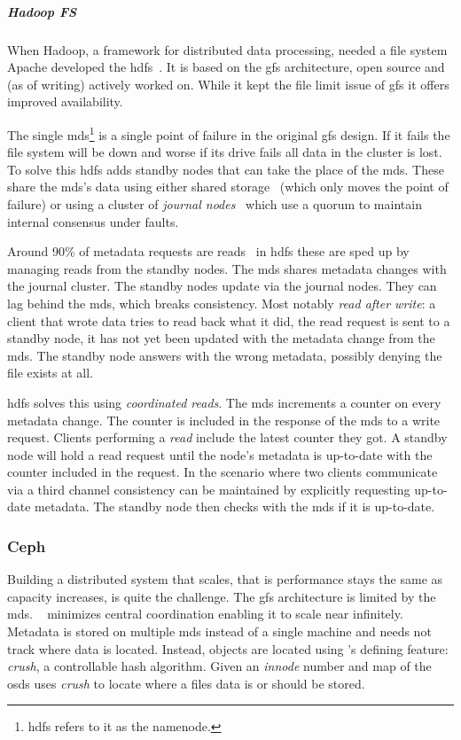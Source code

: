 \subparagraph*{Hadoop FS} \label{sec:hdfs}
When Hadoop, a framework for distributed data processing, needed a file system Apache developed the \ac{hdfs}~\cite{hdfs}. It is based on the \ac{gfs} architecture, open source and (as of writing) actively worked on. While it kept the file limit issue of \ac{gfs} it offers improved availability.

The single \ac{mds}\footnote{\ac{hdfs} refers to it as the namenode.} is a single point of failure in the original \ac{gfs} design. If it fails the file system will be down and worse if its drive fails all data in the cluster is lost. To solve this \ac{hdfs} adds standby nodes that can take the place of the \ac{mds}. These share the \ac{mds}'s data using either shared storage~\cite{hdfs_ha_nfs} (which only moves the point of failure) or using a cluster of \textit{journal nodes}~\cite{hdfs_ha_q} which use a quorum to maintain internal consensus under faults. 

Around 90\% of metadata requests are reads~\cite{hdfs_ha_reads} in \ac{hdfs} these are sped up by managing reads from the standby nodes. The \ac{mds} shares metadata changes with the journal cluster. The standby nodes update via the journal nodes. They can lag behind the \ac{mds}, which breaks consistency. Most notably \textit{read after write}: a client that wrote data tries to read back what it did, the read request is sent to a standby node, it has not yet been updated with the metadata change from the \ac{mds}. The standby node answers with the wrong metadata, possibly denying the file exists at all. 

\ac{hdfs} solves this using \textit{coordinated reads}. The \ac{mds} increments a counter on every metadata change. The counter is included in the response of the \ac{mds} to a write request. Clients performing a \textit{read} include the latest counter they got. A standby node will hold a read request until the node's metadata is up-to-date with the counter included in the request. In the scenario where two clients communicate via a third channel consistency can be maintained by explicitly requesting up-to-date metadata. The standby node then checks with the \ac{mds} if it is up-to-date.

\subsubsection*{Ceph} \label{sec:ceph}
Building a distributed system that scales, that is performance stays the same as capacity increases, is quite the challenge. The \ac{gfs} architecture is limited by the \acf{mds}. \ceph{}~\cite{ceph} minimizes central coordination enabling it to scale near infinitely. Metadata is stored on multiple \ac{mds} instead of a single machine and needs not track where data is located. Instead, objects are located using \ceph{}'s defining feature: \emph{\ac{crush}}, a controllable hash algorithm. Given an \textit{innode} number and map of the \acp{osd} \ceph{} uses \emph{\ac{crush}} to locate where a files data is or should be stored. 

